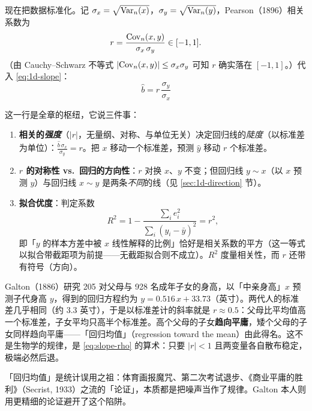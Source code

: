 现在把数据标准化。记 $\sigma_x = \sqrt{\mathrm{Var}_n(x)}$，$\sigma_y = \sqrt{\mathrm{Var}_n(y)}$，Pearson（1896）相关系数\cite{pearson1896}为
\begin{equation}\label{eq:rho}
  r = \frac{\mathrm{Cov}_n(x, y)}{\sigma_x \, \sigma_y} \in [-1, 1].
\end{equation}
（由 Cauchy--Schwarz 不等式 $|\mathrm{Cov}_n(x,y)| \le \sigma_x \sigma_y$ 可知 $r$ 确实落在 $[-1,1]$。）代入 \eqref{eq:1d-slope}：
\begin{equation}\label{eq:slope-rho}
  \boxed{\;\hat{b} = r \, \frac{\sigma_y}{\sigma_x}\;}
\end{equation}

这一行是全章的枢纽，它说三件事：

\begin{enumerate}[label=(\arabic*)]
  \item \textbf{相关的\textit{强度}}（$|r|$，无量纲、对称、与单位无关）决定回归线的\textit{陡度}（以标准差为单位）：$\frac{\hat{b}\, \sigma_x}{\sigma_y} = r$。把 $x$ 移动一个标准差，预测 $\hat{y}$ 移动 $r$ 个标准差。
  \item \textbf{$r$ 的对称性 vs.\ 回归的方向性}：$r$ 对换 $x$、$y$ 不变；但回归线 $y \sim x$（以 $x$ 预测 $y$）与回归线 $x \sim y$ 是两条\textit{不同}的线（见 \ref{sec:1d-direction} 节）。
  \item \textbf{拟合优度}：判定系数
  \begin{equation}\label{eq:r2-rho2}
    R^2 = 1 - \frac{\sum_i e_i^2}{\sum_i (y_i - \bar{y})^2} = r^2,
  \end{equation}
  即「$y$ 的样本方差中被 $x$ 线性解释的比例」恰好是相关系数的平方（这一等式以拟合带截距项为前提——无截距拟合则不成立）。$R^2$ 度量相关性，而 $r$ 还带有符号（方向）。
\end{enumerate}

\begin{example}\label{ex:galton}
Galton（1886）研究 205 对父母与 928 名成年子女的身高，以「中亲身高」$x$ 预测子代身高 $y$，得到的回归方程约为 $y = 0.516\,x + 33.73$（英寸）\cite{galton1886}。两代人的标准差几乎相同（约 3.3 英寸），于是以标准差计的斜率就是 $r \approx 0.5$：父母比平均值高一个标准差，子女平均只高半个标准差。高个父母的子女\textbf{趋向平庸}，矮个父母的子女同样趋向平庸——「回归均值」（regression toward the mean）由此得名。这不是生物学的规律，是 \eqref{eq:slope-rho} 的算术：只要 $|r| < 1$ 且两变量各自散布稳定，极端必然后退。\end{example}

\begin{remark}
「回归均值」是统计误用之祖：体育画报魔咒、第二次考试退步、《商业平庸的胜利》（Secrist, 1933）之流的「论证」，本质都是把噪声当作了规律。Galton 本人则用更精细的论证避开了这个陷阱\cite{galton1886,stigler1986}。
\end{remark}

